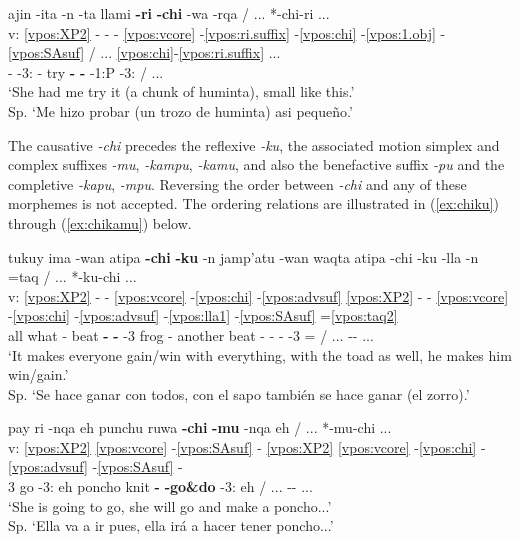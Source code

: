 \documentclass[output=paper]{langscibook}
\begin{document}
\ea \label{ex:richi2}{
    \glll {} ajin -ita -n -ta llami \textbf{-ri} \textbf{-chi} -wa -rqa / ... *-chi-ri ... \\
    v: \ref{vpos:XP2} - - - \ref{vpos:vcore} -\ref{vpos:ri.suffix} -\ref{vpos:chi} -\ref{vpos:1.obj} -\ref{vpos:SAsuf} / ... \ref{vpos:chi}-\ref{vpos:ri.suffix} ... \\
    {} \Dem{} -\Dim{} -3\Sg{}:\Poss{} -\Acc{} try \textbf{-\Aff{}} \textbf{-\Caus{}} -1:P -3\Sg{}:\Pst{} / ...  \\
    \glt `She had me try it (a chunk of huminta), small like this.' \\ 
    Sp. `Me hizo probar (un trozo de huminta) asi pequeño.' }
\z 

The causative \textit{-chi} precedes the reflexive \textit{-ku}, the associated motion simplex and complex suffixes \textit{-mu}, \textit{-kampu}, \textit{-kamu}, and also the benefactive suffix \textit{-pu} and the completive \textit{-kapu}, \textit{-mpu}. Reversing the order between \textit{-chi} and any of these morphemes is not accepted. The ordering relations are illustrated in (\ref{ex:chiku}) through (\ref{ex:chikamu}) below. 

\ea \label{ex:chiku}{
   \glll{} tukuy ima -wan atipa \textbf{-chi} \textbf{-ku} -n jamp'atu -wan waqta atipa -chi -ku -lla -n =taq / ... *-ku-chi ... \\
   v: \ref{vpos:XP2} - - \ref{vpos:vcore} -\ref{vpos:chi} -\ref{vpos:advsuf} \ref{vpos:XP2} - - \ref{vpos:vcore} -\ref{vpos:chi} -\ref{vpos:advsuf} -\ref{vpos:lla1} -\ref{vpos:SAsuf} =\ref{vpos:taq2} \\
   {} all what -\Com{} beat \textbf{-\Caus{}} \textbf{-\Refl{}} -3\Sg{} frog -\Com{} another beat -\Caus{} -\Refl{} -\Limit{} -3\Sg{} =\Conj{} / ... -\Refl{}-\Caus{} ... \\
   \glt `It makes everyone gain/win with everything, with the toad as well, he makes him win/gain.' \\ Sp. `Se hace ganar con todos, con el sapo también se hace ganar (el zorro).' }
\z 

\ea \label{ex:chimu}{
    \glll {} pay ri -nqa eh punchu ruwa \textbf{-chi} \textbf{-mu} -nqa eh /  ... *-mu-chi ... \\
    v: \ref{vpos:XP2} \ref{vpos:vcore} -\ref{vpos:SAsuf} - \ref{vpos:XP2} \ref{vpos:vcore} -\ref{vpos:chi} -\ref{vpos:advsuf} -\ref{vpos:SAsuf} -  \\
    {} 3\Sg{} go -3\Sg{}:\Fut{} eh poncho knit \textbf{-\Caus{}} \textbf{-go\&do} -3\Sg{}:\Fut{} eh / ... -\Mot{}-\Caus{} ... \\
    \glt `She is going to go, she will go and make a poncho...' \\ Sp. `Ella va a ir pues, ella irá a hacer tener poncho...' }
\z
\end{document}
